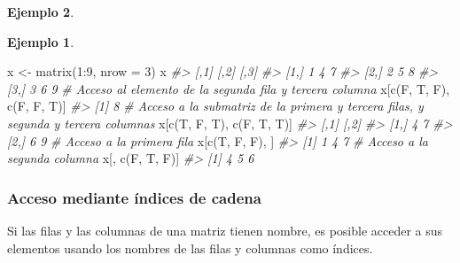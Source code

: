 \documentclass[
]{book}
\newenvironment{Shaded}{\begin{snugshade}}{\end{snugshade}}
\newcommand{\AttributeTok}[1]{\textcolor[rgb]{0.77,0.63,0.00}{#1}}
\newcommand{\CommentTok}[1]{\textcolor[rgb]{0.56,0.35,0.01}{\textit{#1}}}
\newcommand{\DecValTok}[1]{\textcolor[rgb]{0.00,0.00,0.81}{#1}}
\newcommand{\FunctionTok}[1]{\textcolor[rgb]{0.00,0.00,0.00}{#1}}
\newcommand{\NormalTok}[1]{#1}
\newcommand{\OtherTok}[1]{\textcolor[rgb]{0.56,0.35,0.01}{#1}}
\newcommand{\SpecialCharTok}[1]{\textcolor[rgb]{0.00,0.00,0.00}{#1}}
\theoremstyle{definition}
\theoremstyle{definition}
\newtheorem{example}{Ejemplo}[chapter]
\theoremstyle{definition}
\theoremstyle{definition}
\theoremstyle{remark}
\begin{document}
\begin{example}
\begin{example}
\begin{Shaded}
\begin{Highlighting}[]
\NormalTok{x }\OtherTok{\textless{}{-}} \FunctionTok{matrix}\NormalTok{(}\DecValTok{1}\SpecialCharTok{:}\DecValTok{9}\NormalTok{, }\AttributeTok{nrow =} \DecValTok{3}\NormalTok{)}
\NormalTok{x}
\CommentTok{\#\textgreater{}      [,1] [,2] [,3]}
\CommentTok{\#\textgreater{} [1,]    1    4    7}
\CommentTok{\#\textgreater{} [2,]    2    5    8}
\CommentTok{\#\textgreater{} [3,]    3    6    9}
\CommentTok{\# Acceso al elemento de la segunda fila y tercera columna}
\NormalTok{x[}\FunctionTok{c}\NormalTok{(F, T, F), }\FunctionTok{c}\NormalTok{(F, F, T)]}
\CommentTok{\#\textgreater{} [1] 8}
\CommentTok{\# Acceso a la submatriz de la primera y tercera filas, y segunda y tercera columnas}
\NormalTok{x[}\FunctionTok{c}\NormalTok{(T, F, T), }\FunctionTok{c}\NormalTok{(F, T, T)]}
\CommentTok{\#\textgreater{}      [,1] [,2]}
\CommentTok{\#\textgreater{} [1,]    4    7}
\CommentTok{\#\textgreater{} [2,]    6    9}
\CommentTok{\# Acceso a la primera fila}
\NormalTok{x[}\FunctionTok{c}\NormalTok{(T, F, F), ]}
\CommentTok{\#\textgreater{} [1] 1 4 7}
\CommentTok{\# Acceso a la segunda columna}
\NormalTok{x[, }\FunctionTok{c}\NormalTok{(F, T, F)]}
\CommentTok{\#\textgreater{} [1] 4 5 6}
\end{Highlighting}
\end{Shaded}

\end{example}

\hypertarget{acceso-mediante-uxedndices-de-cadena}{%
\subsubsection{Acceso mediante índices de cadena}\label{acceso-mediante-uxedndices-de-cadena}}

Si las filas y las columnas de una matriz tienen nombre, es posible acceder a sus elementos usando los nombres de las filas y columnas como índices.


\end{example}
\end{document}
